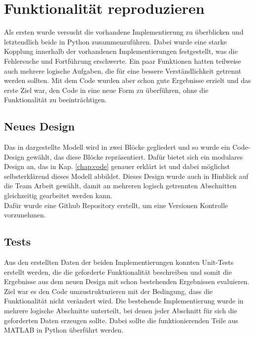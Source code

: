 \documentclass[../Report.tex]{subfiles}
\begin{document}
\section[Funktionalität reproduzieren]{Funktionalität reproduzieren}
\label{sec:vorg.reproduktion}
Als ersten wurde versucht die vorhandene Implementierung zu überblicken und letztendlich beide in Python zusammenzuführen. Dabei wurde eine starke Kopplung innerhalb der vorhandenen Implementierungen festgestellt, was die Fehlersuche und Fortführung erschwerte. Ein paar Funktionen hatten teilweise auch mehrere logische Aufgaben, die für eine bessere Verständlichkeit getrennt werden sollten. Mit dem Code wurden aber schon gute Ergebnisse erzielt und das erste Ziel war, den Code in eine neue Form zu überführen, ohne die Funktionalität zu beeinträchtigen.
\subsection{Neues Design}
\label{sec:vorg.design}
Das in  dargestellte Modell wird in zwei Blöcke gegliedert und so wurde ein Code-Design gewählt, das diese Blöcke repräsentiert. Dafür bietet sich ein modulares Design an, das in Kap. \ref{chap:code} genauer erklärt ist und dabei möglichst selbsterklärend dieses Modell abbildet. Dieses Design wurde auch in Hinblick auf die Team Arbeit gewählt, damit an mehreren logisch getrennten Abschnitten gleichzeitig gearbeitet werden kann. \\ Dafür wurde eine Github Repository erstellt, um eine Versionen Kontrolle vorzunehmen.
\subsection{Tests}
\label{sec:vorg.tests}
Aus den erstellten Daten der beiden Implementierungen konnten Unit-Tests erstellt werden, die die geforderte Funktionalität beschreiben und somit die Ergebnisse aus dem neuen Design mit schon bestehenden Ergebnissen evaluieren. \\ Ziel war es den Code umzustrukturieren mit der Bedingung, dass die Funktionalität nicht verändert wird. Die bestehende Implementierung wurde in mehrere logische Abschnitte unterteilt, bei denen jeder Abschnitt für sich die geforderten Daten erzeugen sollte. Dabei sollte die funktionierenden Teile aus MATLAB in Python überführt werden.
\end{document}
